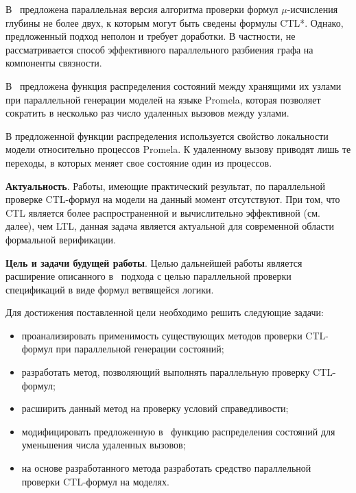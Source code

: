 \documentclass[a4paper,notitlepage,14pt]{article}
\begin{document}
В~\cite{Leucker_parallelmodel} предложена параллельная версия алгоритма проверки формул
$\mu$-исчисления глубины не более двух, к которым могут быть сведены формулы CTL*. Однако,
предложенный подход неполон и требует доработки. В частности, не рассматривается способ
эффективного параллельного разбиения графа на компоненты связности.

В~\cite{Korotkov10Miem} предложена функция распределения состояний между хранящими их
узлами при параллельной генерации моделей на языке Promela, которая позволяет сократить в
несколько раз число удаленных вызовов между узлами.

В предложенной функции распределения используется свойство локальности модели относительно
процессов Promela. К удаленному вызову приводят лишь те переходы, в которых меняет свое
состояние один из процессов.


\textbf{Актуальность}. Работы, имеющие практический результат, по параллельной проверке
CTL-формул на модели на данный момент отсутствуют. При том, что CTL является более
распространенной и вычислительно эффективной (см. далее), чем LTL, данная задача является
актуальной для современной области формальной верификации.


\textbf{Цель и задачи будущей работы}. Целью дальнейшей работы является расширение
описанного в~\cite{Korotkov10Miem} подхода с целью параллельной проверки спецификаций в
виде формул ветвящейся логики.

Для достижения поставленной цели необходимо решить следующие задачи:

\begin{itemize}
\item проанализировать применимость существующих методов проверки CTL-формул при
  параллельной генерации состояний;
\item разработать метод, позволяющий выполнять параллельную проверку CTL-формул;
\item расширить данный метод на проверку условий справедливости;
\item модифицировать предложенную в~\cite{Korotkov10Miem} функцию распределения состояний
  для уменьшения числа удаленных вызовов;
\item на основе разработанного метода разработать средство параллельной проверки
  CTL-формул на моделях.
\end{itemize}
\end{document}
